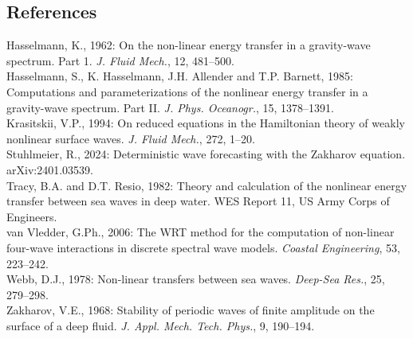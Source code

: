 \documentclass[12pt]{article}
\begin{document}
\subsection*{References}

\noindent Hasselmann, K., 1962: On the non-linear energy transfer in a
gravity-wave spectrum. Part 1. \emph{J. Fluid Mech.}, 12, 481--500. \\
Hasselmann, S., K. Hasselmann, J.H. Allender and T.P. Barnett, 1985:
Computations and parameterizations of the nonlinear energy transfer in a
gravity-wave spectrum. Part II. \emph{J. Phys. Oceanogr.}, 15, 1378--1391. \\
Krasitskii, V.P., 1994: On reduced equations in the Hamiltonian theory of
weakly nonlinear surface waves. \emph{J. Fluid Mech.}, 272, 1--20. \\
Stuhlmeier, R., 2024: Deterministic wave forecasting with the Zakharov
equation. arXiv:2401.03539. \\
Tracy, B.A. and D.T. Resio, 1982: Theory and calculation of the nonlinear
energy transfer between sea waves in deep water. WES Report 11, US Army
Corps of Engineers. \\
van Vledder, G.Ph., 2006: The WRT method for the computation of non-linear
four-wave interactions in discrete spectral wave models.
\emph{Coastal Engineering}, 53, 223--242. \\
Webb, D.J., 1978: Non-linear transfers between sea waves.
\emph{Deep-Sea Res.}, 25, 279--298. \\
Zakharov, V.E., 1968: Stability of periodic waves of finite amplitude on the
surface of a deep fluid. \emph{J. Appl. Mech. Tech. Phys.}, 9, 190--194.
\end{document}
